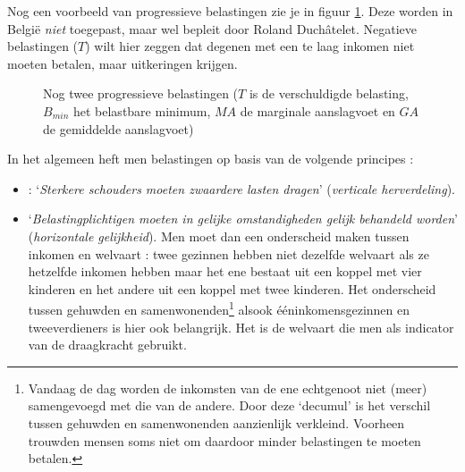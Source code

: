 Nog een voorbeeld van progressieve belastingen zie je in figuur \ref{fig:h4-progbel}. Deze worden in Belgi\"e \textit{niet} toegepast, maar wel bepleit door Roland Duch\^{a}telet. Negatieve belastingen ($T$) wilt hier zeggen dat degenen met een te laag inkomen niet moeten betalen, maar uitkeringen krijgen. 
\begin{figure}[H]
\centering
\captionsetup{justification=centering,margin=2cm}
\caption{Nog twee progressieve belastingen ($T$ is de verschuldigde belasting, $B_{min}$ het belastbare minimum, $MA$ de marginale aanslagvoet en $GA$ de gemiddelde aanslagvoet)}
\label{fig:h4-progbel}
\end{figure}

\noindent In het algemeen heft men belastingen op basis van de volgende principes :
\begin{itemize}
\item {} : `\textit{Sterkere schouders moeten zwaardere lasten dragen}' (\textit{verticale herverdeling}).
\item `\textit{Belastingplichtigen moeten in gelijke omstandigheden gelijk behandeld worden}' (\textit{horizontale gelijkheid}). Men moet dan een onderscheid maken tussen inkomen en welvaart : twee gezinnen hebben niet dezelfde welvaart als ze hetzelfde inkomen hebben maar het ene bestaat uit een koppel met vier kinderen en het andere uit een koppel met twee kinderen. Het onderscheid tussen gehuwden en samenwonenden\footnote{Vandaag de dag worden de inkomsten van de ene echtgenoot niet (meer) samengevoegd met die van de andere. Door deze `decumul' is het verschil tussen gehuwden en samenwonenden aanzienlijk verkleind. Voorheen trouwden mensen soms niet om daardoor minder belastingen te moeten betalen.} alsook \'e\'eninkomensgezinnen en tweeverdieners is hier ook belangrijk. Het is de welvaart die men als indicator van de draagkracht gebruikt.
\end{itemize}

